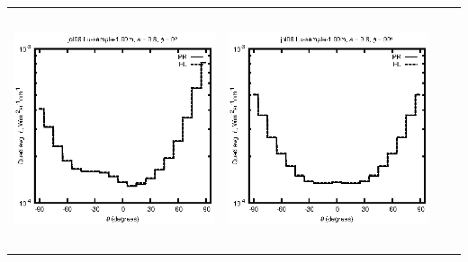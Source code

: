 \begin{tabular}{c c c c}
\includegraphics[height=7cm]{../eps/jol08_Lu_sample_1.00m_fwd.eps} &
\includegraphics[height=7cm]{../eps/jol08_Lu_sample_1.00m_cross.eps} \\
\end{tabular}

\pagebreak

